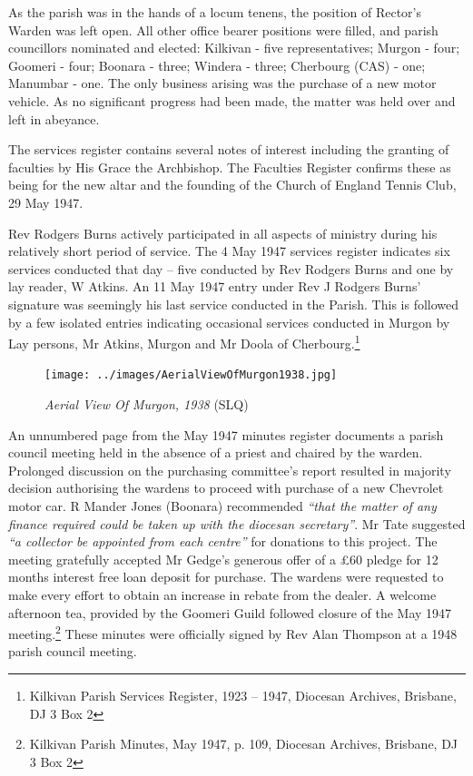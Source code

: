 As the parish was in the hands of a locum tenens, the position of Rector's Warden was left open. All other office bearer positions were filled, and parish councillors nominated and elected: Kilkivan - five representatives; Murgon - four; Goomeri - four; Boonara - three; Windera - three; Cherbourg (CAS) - one; Manumbar - one. The only business arising was the purchase of a new motor vehicle. As no significant progress had been made, the matter was held over and left in abeyance.



The services register contains several notes of interest including the granting of faculties by His Grace the Archbishop. The Faculties Register confirms these as being for the new altar and the founding of the Church of England Tennis Club, 29 May 1947.



Rev Rodgers Burns actively participated in all aspects of ministry during his relatively short period of service. The 4 May 1947 services register indicates six services conducted that day -- five conducted by Rev Rodgers Burns and one by lay reader, W Atkins. An 11 May 1947 entry under Rev J Rodgers Burns' signature was seemingly his last service conducted in the Parish. This is followed by a few isolated entries indicating occasional services conducted in Murgon by Lay persons, Mr Atkins, Murgon and Mr Doola of Cherbourg.\footnote{Kilkivan Parish Services Register, 1923 -- 1947, Diocesan Archives, Brisbane, DJ 3 Box 2}








\begin{figure}[htb]
\begin{center}
\texttt{[image: ../images/AerialViewOfMurgon1938.jpg]}
\caption{{\itshape Aerial View Of Murgon, 1938} {\scriptsize(SLQ)}}
\end{center}
\end{figure}




An unnumbered page from the May 1947 minutes register documents a parish council meeting held in the absence of a priest and chaired by the warden. Prolonged discussion on the purchasing committee's report resulted in majority decision authorising the wardens to proceed with purchase of a new Chevrolet motor car. R Mander Jones (Boonara) recommended \emph{``that the matter of any finance required could be taken up with the diocesan secretary''}. Mr Tate suggested \emph{``a collector be appointed from each centre''} for donations to this project. The meeting gratefully accepted Mr Gedge's generous offer of a \pounds60 pledge for 12 months interest free loan deposit for purchase. The wardens were requested to make every effort to obtain an increase in rebate from the dealer. A welcome afternoon tea, provided by the Goomeri Guild followed closure of the May 1947 meeting.\footnote{Kilkivan Parish Minutes, May 1947, p. 109, Diocesan Archives, Brisbane, DJ 3 Box 2} These minutes were officially signed by Rev Alan Thompson at a 1948 parish council meeting.


